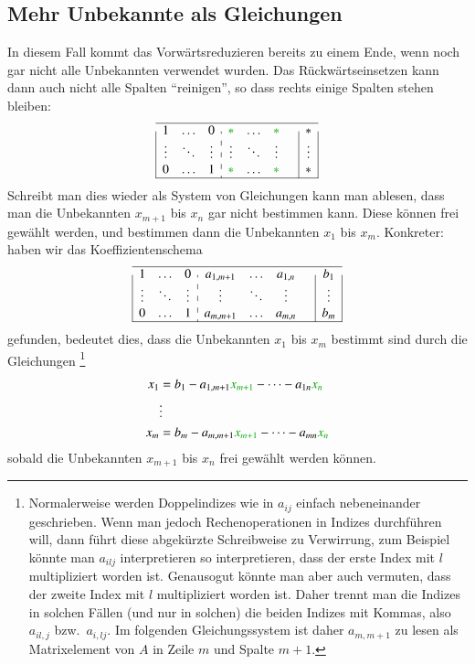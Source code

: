 \subsection{Mehr Unbekannte als Gleichungen}
In diesem Fall kommt das Vorwärtsreduzieren bereits zu einem Ende,
wenn noch gar nicht alle Unbekannten verwendet wurden.
Das Rückwärtseinsetzen kann dann auch nicht alle Spalten ``reinigen'',
so dass rechts einige Spalten stehen bleiben:
\begin{gather}
\definecolor{greenT}{rgb}{0,0.666,0}
\begin{array}{|ccc:cccc|c|}
\hline
1&\dots&0&\color{greenT}*&\dots&\color{greenT}*&&*\\
\vdots&\ddots&\vdots&\vdots&\ddots&\vdots&&\vdots\\
0&\dots&1&\color{greenT}*&\dots&\color{greenT}*&&*\\
\hline
\end{array}
\end{gather}
%
Schreibt man dies wieder als System von Gleichungen kann man ablesen,
dass man die Unbekannten $x_{m+1}$ bis $x_n$ gar nicht bestimmen kann.
Diese können frei gewählt werden, und bestimmen dann die Unbekannten
$x_1$ bis $x_m$.
Konkreter: haben wir das Koeffizientenschema
\begin{gather}
\begin{array}{|ccc:cccc|c|}
\hline
1&\dots&0&a_{1,m+1}&\dots&a_{1,n}&&b_1\\
\vdots&\ddots&\vdots&\vdots&\ddots&\vdots&&\vdots\\
0&\dots&1&a_{m,m+1}&\dots&a_{m,n}&&b_m\\
\hline
\end{array}
\end{gather}
gefunden, bedeutet dies, dass die Unbekannten $x_1$ bis $x_m$ bestimmt
sind durch die Gleichungen%
\footnote{Normalerweise werden Doppelindizes wie in $a_{ij}$ einfach
nebeneinander geschrieben.
Wenn man jedoch Rechenoperationen in Indizes durchführen will, dann 
führt diese abgekürzte Schreibweise zu Verwirrung, zum Beispiel
könnte man $a_{ilj}$ interpretieren so interpretieren, dass der erste
Index mit $l$ multipliziert worden ist. 
Genausogut könnte man aber auch vermuten, dass der zweite Index mit
$l$ multipliziert worden ist.
Daher trennt man die Indizes in solchen Fällen (und nur in solchen)
die beiden Indizes mit Kommas, also $a_{il,j}$ bzw.~$a_{i,lj}$.
Im folgenden Gleichungssystem ist daher $a_{m,m+1}$ zu lesen als
Matrixelement von $A$ in Zeile $m$ und Spalte $m+1$.
}
{
\begin{align*}
x_1&=b_1-a_{1,m+1}{\color{greenT}x_{m+1}}-\dots-a_{1n}{\color{greenT}x_n}\\
&\vdots\\
x_m&=b_m-a_{m,m+1}{\color{greenT}x_{m+1}}-\dots-a_{mn}{\color{greenT}x_n}
\end{align*}
}
sobald die Unbekannten $x_{m+1}$ bis $x_n$ frei gewählt werden können.
